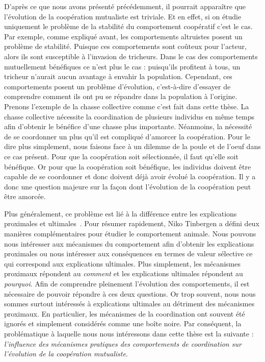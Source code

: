		D'après ce que nous avons présenté précédemment, il pourrait apparaître que l'évolution de la coopération mutualiste est triviale. Et en effet, si on étudie uniquement le problème de la stabilité du comportement coopératif c'est le cas. Par exemple, comme expliqué avant, les comportements altruistes posent un problème de stabilité. Puisque ces comportements sont coûteux pour l'acteur, alors ils sont susceptible à l'invasion de tricheurs. Dans le cas des comportements mutuellement bénéfiques ce n'est plus le cas : puisqu'ils profitent à tous, un tricheur n'aurait aucun avantage à envahir la population. Cependant, ces comportements posent un problème d'évolution, c'est-à-dire d'essayer de comprendre comment ils ont pu se répandre dans la population à l'origine. Prenons l'exemple de la chasse collective comme c'est fait dans cette thèse. La chasse collective nécessite la coordination de plusieurs individus en même temps afin d'obtenir le bénéfice d'une chasse plus importante. Néanmoins, la nécessité de se coordonner un plus qu'il est compliqué d'amorcer la coopération. Pour le dire plus simplement, nous faisons face à un dilemme de la poule et de l'oeuf dans ce cas présent. Pour que la coopération soit sélectionnée, il faut qu'elle soit bénéfique. Or pour que la coopération soit bénéfique, les individus doivent être capable de se coordonner et donc doivent déjà avoir évolué la coopération. Il y a donc une question majeure sur la façon dont l'évolution de la coopération peut être amorcée.

		Plus généralement, ce problème est lié à la différence entre les explications proximales et ultimales~\parencite{Tinbergen1963}. Pour résumer rapidement, Niko Tinbergen a défini deux manières complémentaires pour étudier le comportement animale. Nous pouvons nous intéresser aux mécanismes du comportement afin d'obtenir les explications proximales ou nous intéresser aux conséquences en termes de valeur sélective ce qui correspond aux explications ultimales. Plus simplement, les mécanismes proximaux répondent au \emph{comment} et les explications ultimales répondent au \emph{pourquoi}. Afin de comprendre pleinement l'évolution des comportements, il est nécessaire de pouvoir répondre à ces deux questions. Or trop souvent, nous nous sommes surtout intéressés à explications ultimales au détriment des mécanismes proximaux. En particulier, les mécanismes de la coordination ont souvent été ignorés et simplement considérés comme une boîte noire. Par conséquent, la problématique à laquelle nous nous intéressons dans cette thèse est la suivante :
		\emph{l'influence des mécanismes pratiques des comportements de coordination sur l'évolution de la coopération mutualiste}.



